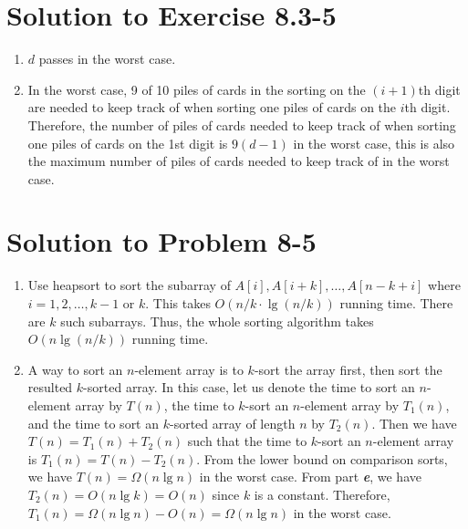 \documentclass[a4paper, fleqn]{article}
\begin{document}
\section*{Solution to Exercise 8.3-5}
\begin{enumerate}
\item
$d$ passes in the worst case.
\item
In the worst case, 9 of 10 piles of cards in the sorting on the $(i + 1)$th 
digit are needed to keep track of when sorting one piles of cards on the $i$th 
digit. Therefore, the number of piles of cards needed to keep track of when 
sorting one piles of cards on the 1st digit is $9(d - 1)$ in the worst case, 
this is also the maximum number of piles of cards needed to keep track of in the 
worst case.
\end{enumerate}







\section*{Solution to Problem 8-5}
\begin{enumerate}
\renewcommand{\labelenumi}{\itshape \bfseries \alph{enumi}.}

\item  %

Use heapsort to sort the subarray of $A[i], A[i + k], \ldots, A[n - k + i]$ 
where $i = 1, 2, \ldots, k-1$ or $k$. This takes $O(n / k \cdot \lg(n / k))$ 
running time. There are $k$ such subarrays. Thus, the whole sorting algorithm 
takes $O(n \lg(n / k))$ running time.




\item  %

A way to sort an $n$-element array is to $k$-sort the array first, then sort the 
resulted $k$-sorted array. In this case, let us denote the time to sort an 
$n$-element array by $T(n)$, the time to $k$-sort an $n$-element array by $T_1(n)$, 
and the time to sort an $k$-sorted array of length $n$ by $T_2(n)$. Then we have 
$T(n) = T_1(n) + T_2(n)$ such that the time to $k$-sort an $n$-element array is 
$T_1(n) = T(n) - T_2(n)$. From the lower bound on comparison sorts, we have $T(n) 
= \Omega(n \lg n)$ in the worst case. From part \textit{\textbf{e}}, we have 
$T_2(n) = O(n \lg k) = O(n)$ since $k$ is a constant. Therefore, $T_1(n) = 
\Omega(n \lg n) - O(n) = \Omega(n \lg n)$ in the worst case.

\end{enumerate}
\end{document}

